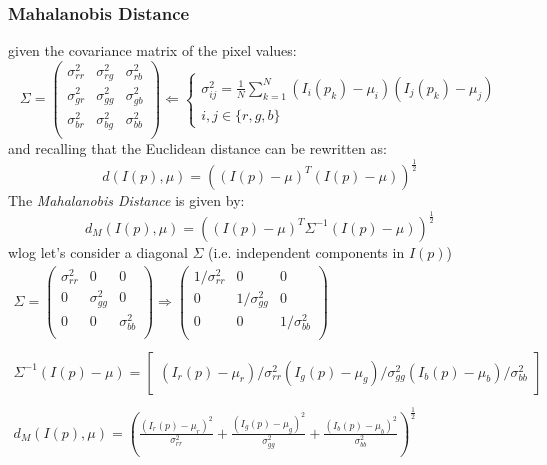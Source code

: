 \documentclass{article}
\begin{document}
\subsubsection{Mahalanobis Distance}
given the covariance matrix of the pixel values:
\[
    \Sigma = \begin{pmatrix}
        \sigma_{rr}^2 & \sigma_{rg}^2 & \sigma_{rb}^2 \\
        \sigma_{gr}^2 & \sigma_{gg}^2 & \sigma_{gb}^2 \\
        \sigma_{br}^2 & \sigma_{bg}^2 & \sigma_{bb}^2 \\
    \end{pmatrix} \Leftarrow \begin{cases}
        \sigma^2_{ij} = \frac{1}{N}\sum_{k=1}^{N}(I_i(p_k)-\mu_i)(I_j(p_k)-\mu_j)\\
        i,j \in \{r,g,b\}
    \end{cases}
\]
and recalling that the Euclidean distance can be rewritten as:
\[
    d(I(p),\mu) = ((I(p)-\mu)^T(I(p)-\mu))^{\frac{1}{2}}
\]
The \emph{Mahalanobis Distance} is given by:
\[
    d_M(I(p),\mu) = ((I(p)-\mu)^T\Sigma^{-1}(I(p)-\mu))^{\frac{1}{2}}
\]
wlog let's consider a diagonal $\Sigma$ (i.e. independent components in $I(p)$)
\begin{gather*}
    \Sigma = \begin{pmatrix}
        \sigma_{rr}^2 & 0 & 0 \\
        0 & \sigma_{gg}^2 & 0 \\
        0 & 0 & \sigma_{bb}^2 \\
    \end{pmatrix} \Rightarrow \begin{pmatrix}
        1/\sigma_{rr}^2 & 0 & 0 \\
        0 & 1/\sigma_{gg}^2 &  0 \\
        0 & 0 & 1/\sigma_{bb}^2 \\
    \end{pmatrix} \\ \\
    \Sigma^{-1}(I(p)-\mu) = \begin{bmatrix}
        (I_r(p)-\mu_r)/\sigma_{rr}^2
        (I_g(p)-\mu_g)/\sigma_{gg}^2
        (I_b(p)-\mu_b)/\sigma_{bb}^2
    \end{bmatrix} \\ \\
d_M(I(p),\mu) = \left( \displaystyle\frac{(I_r(p)-\mu_r)^2}{\sigma_{rr}^2} + \displaystyle\frac{(I_g(p)-\mu_g)^2}{\sigma_{gg}^2} + \displaystyle\frac{(I_b(p)-\mu_b)^2}{\sigma_{bb}^2}   \right)^{\frac{1}{2}}
\end{gather*}
\end{document}
